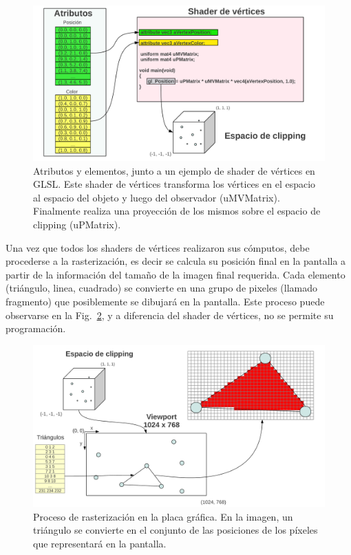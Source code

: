 \begin{figure}[h]
\begin{center}
\includegraphics[width=13cm]{figures/vertexshader}
\end{center}
\caption[Atributos y elementos, junto a un ejemplo de shader de vértices en GLSL.]{Atributos y elementos, junto a un ejemplo de shader de vértices en GLSL. Este shader de vértices transforma los vértices en el espacio al espacio del objeto y luego del observador (uMVMatrix). Finalmente realiza una proyección de los mismos sobre el espacio de clipping (uPMatrix).}
\label{fg:vertexshader}
\end{figure}

Una vez que todos los shaders de vértices realizaron sus cómputos, debe procederse a la rasterización, es decir se calcula su posición final en la pantalla a partir de la información del tamaño de la imagen final requerida.
Cada elemento (triángulo, linea, cuadrado) se convierte en una grupo de pixeles (llamado fragmento) que posiblemente se dibujará en la pantalla.
Este proceso puede observarse en la Fig.~\ref{fg:raster}, y a diferencia del shader de vértices, no se permite su programación.


\begin{figure}[h]
\begin{center}
\includegraphics[width=13cm]{figures/raster}
\end{center}
\caption[Proceso de rasterización en la placa gráfica]{Proceso de rasterización en la placa gráfica. En la imagen, un triángulo se convierte en el conjunto de las posiciones de los píxeles que representará en la pantalla.}
\label{fg:raster}
\end{figure}

